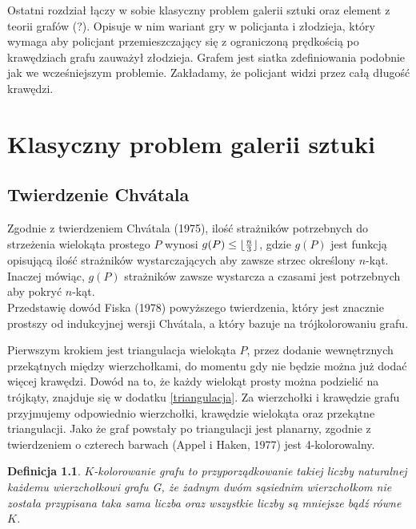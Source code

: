 \documentclass[brudnopis]{xmgr}
\DeclarePairedDelimiter\floor{\lfloor}{\rfloor}
\newtheorem{Definicja}{Definicja} \theoremstyle{definition}
\begin{document}
Ostatni rozdział łączy w sobie klasyczny problem galerii sztuki oraz element z teorii grafów (?). Opisuje w nim wariant gry w policjanta i złodzieja, który wymaga aby policjant przemieszczający się z ograniczoną prędkością po krawędziach grafu zauważył złodzieja. Grafem jest siatka zdefiniowania podobnie jak we wcześniejszym problemie. Zakładamy, że policjant widzi przez całą długość krawędzi.




\chapter{Klasyczny problem galerii sztuki}

\section{Twierdzenie Chv\'atala}
Zgodnie z twierdzeniem Chv\'atala (1975)\label{tw chvatala}, ilość strażników potrzebnych do strzeżenia wielokąta prostego $P$ wynosi $g(P) \le \floor{\frac{n}{3}}$, gdzie $g(P)$ jest funkcją opisującą ilość strażników wystarczających aby zawsze strzec określony $n$-kąt. Inaczej mówiąc, $g(P)$ strażników zawsze wystarcza a czasami jest potrzebnych aby pokryć $n$-kąt.
\\Przedstawię dowód Fiska (1978) powyższego twierdzenia, który jest znacznie prostszy od indukcyjnej wersji Chv\'atala, a który bazuje na trójkolorowaniu grafu. 

Pierwszym krokiem jest triangulacja wielokąta $P$, przez dodanie wewnętrznych przekątnych między wierzchołkami, do momentu gdy nie będzie można już dodać więcej krawędzi. 
Dowód na to, że każdy wielokąt prosty można podzielić na trójkąty, znajduje się w dodatku \ref{triangulacja}.
Za wierzchołki i krawędzie grafu przyjmujemy odpowiednio wierzchołki, krawędzie wielokąta oraz przekątne triangulacji. Jako że graf powstały po triangulacji jest planarny, zgodnie z twierdzeniem o czterech barwach (Appel i Haken, 1977) jest 4-kolorowalny.

\begin{Definicja}
   \textnormal{$K$-kolorowanie grafu} to przyporządkowanie takiej liczby naturalnej każdemu wierzchołkowi grafu G, że żadnym dwóm sąsiednim wierzchołkom nie została przypisana taka sama liczba oraz wszystkie liczby są mniejsze bądź równe $K$.
\end{Definicja}
\end{document}
